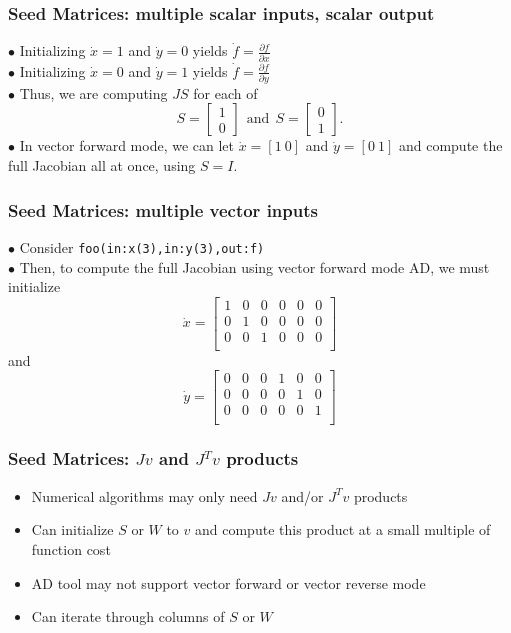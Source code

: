 \documentclass[compact,12pt]{beamer}
\newcommand{\prtl}[2]{\frac{\partial #1}{\partial #2}}
\begin{document}
\begin{frame}
\large\frametitle{Seed Matrices: multiple scalar inputs, scalar output}
$\bullet$ Initializing $\Dot{x} = 1$ and $\Dot{y} = 0$ yields $\Dot{f} = \prtl{f}{x}$\\
$\bullet$ Initializing $\Dot{x} = 0$ and $\Dot{y} = 1$ yields $\Dot{f} = \prtl{f}{y}$\\
$\bullet$ Thus, we are computing $JS$ for each of 
$$
S = \left[ \begin{array}{c}
     1  \\
     0 
\end{array}\right]\ \  \mbox{and}\ \ 
S = \left[ \begin{array}{c}
     0  \\
     1 
\end{array}\right].
$$
$\bullet$ In vector forward mode, we can let  $\Dot{x} = [1\ 0]$ and $\Dot{y} = [0\ 1]$ and compute the full Jacobian all at once, using $S = I$.
\end{frame}

\begin{frame}
\large\frametitle{Seed Matrices: multiple vector inputs}
$\bullet$ Consider \texttt{foo(in:x(3),in:y(3),out:f)}\\[0.5em]
$\bullet$ Then, to compute the full Jacobian using vector forward mode AD, we must initialize
$$
\Dot{x} = \left[ \begin{array}{cccccc}
     1 & 0 & 0 & 0 & 0 & 0\\
     0 & 1 & 0 & 0 & 0 & 0\\
     0 & 0 & 1 & 0 & 0 & 0\\
\end{array}\right]
$$ and
$$
\Dot{y} = \left[ \begin{array}{cccccc}
     0 & 0 & 0 & 1 & 0 & 0\\
     0 & 0 & 0 & 0 & 1 & 0\\
     0 & 0 & 0 & 0 & 0 & 1\\
\end{array}\right]
$$
\end{frame}


\begin{frame}
\large\frametitle{Seed Matrices: $Jv$ and $J^Tv$ products}
\begin{itemize}
    \item Numerical algorithms may only need $Jv$ and/or $J^Tv$ products
    \item Can initialize $S$ or $W$ to $v$ and compute this product at a small multiple of function cost
    \item AD tool may not support vector forward or vector reverse mode
    \item Can iterate through columns of $S$ or $W$
\end{itemize}
\end{frame}
\end{document}
